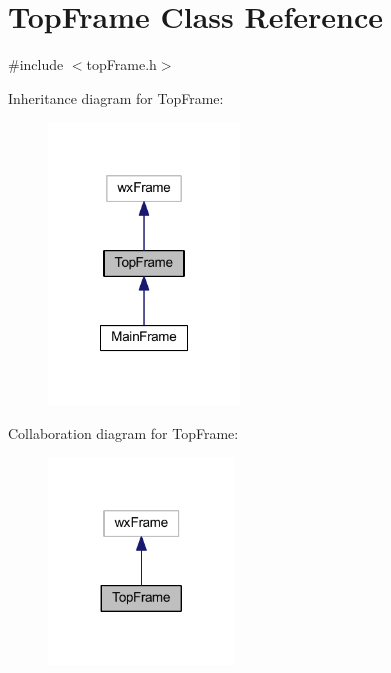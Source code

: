 \hypertarget{class_top_frame}{\section{Top\-Frame Class Reference}
\label{class_top_frame}
}


{\ttfamily \#include $<$top\-Frame.\-h$>$}



Inheritance diagram for Top\-Frame\-:\nopagebreak
\begin{figure}[H]
\begin{center}
\leavevmode
\includegraphics[width=144pt]{class_top_frame__inherit__graph}
\end{center}
\end{figure}


Collaboration diagram for Top\-Frame\-:\nopagebreak
\begin{figure}[H]
\begin{center}
\leavevmode
\includegraphics[width=140pt]{class_top_frame__coll__graph}
\end{center}
\end{figure}
